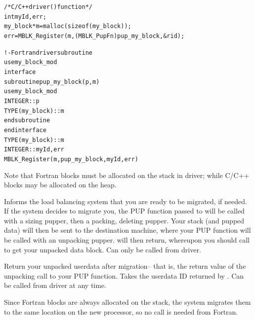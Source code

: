 \documentclass[10pt]{article}
\begin{document}
\begin{alltt}
          /*C/C++ driver() function*/
	  int myId, err;
          my_block *m=malloc(sizeof(my_block));
          err =MBLK_Register(m,(MBLK_PupFn)pup_my_block,&rid);
 
          !- Fortran driver subroutine
          use my_block_mod
          interface
            subroutine pup_my_block(p,m)
              use my_block_mod
              INTEGER :: p
              TYPE(my_block) :: m
            end subroutine
          end interface
          TYPE(my_block) :: m
          INTEGER :: myId,err
          MBLK_Register(m,pup_my_block,myId,err)
\end{alltt}

     Note that Fortran blocks must be allocated on the stack in driver;
     while C/C++ blocks may be allocated on the heap.
\vspace{0.2in}

     Informs the load balancing system that you are ready to be
     migrated, if needed.  If the system decides to migrate you, the
     PUP function passed to  will be called with a sizing
     pupper, then a packing, deleting pupper.  Your stack (and pupped
     data) will then be sent to the destination machine, where your PUP
     function will be called with an unpacking pupper.  
     will then return, whereupon you should call  to
     get your unpacked data block.  Can only be called from driver.



     Return your unpacked userdata after migration-- that is, the
     return value of the unpacking call to your PUP function.  Takes
     the userdata ID returned by .  Can be called from
     driver at any time.

     Since Fortran blocks are always allocated on the stack, the system
     migrates them to the same location on the new processor, so no
      call is needed from Fortran.

\end{document}
